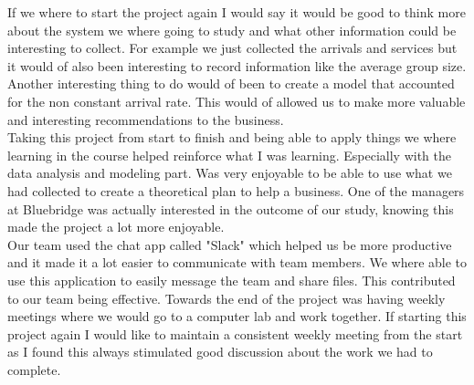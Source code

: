 \documentclass[a4paper, 12pt]{article}
\begin{document}
		If we where to start the project again I would say it would be good to think more about the system we where going to study and what other information could be interesting to collect. For example we just collected the arrivals and services but it would of also been interesting to record information like the average group size.\\
		
		Another interesting thing to do would of been to create a model that accounted for the non constant arrival rate. This would of allowed us to make more valuable and interesting recommendations to the business.\\
		
		Taking this project from start to finish and being able to apply things we where learning in the course helped reinforce what I was learning. Especially with the data analysis  and modeling part. Was very enjoyable to be able to use what we had collected to create a theoretical plan to help a business. One of the managers at Bluebridge was actually interested in the outcome of our study, knowing this made the project a lot more enjoyable.\\
		
		Our team used the chat app called "Slack" which helped us be more productive and it made it a lot easier to communicate with team members. We where able to use this application to easily message the team and share files. This contributed to our team being effective. Towards the end of the project was having weekly meetings where we would go to a computer lab and work together. If starting this project again I would like to maintain a consistent weekly meeting from the start as I found this always stimulated good discussion about the work we had to complete.
\end{document}
